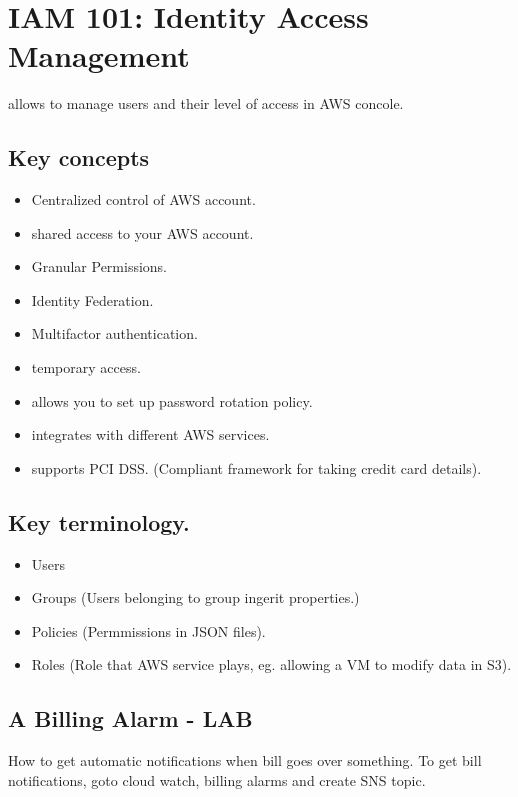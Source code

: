 \chapter{IAM 101: Identity Access Management}
allows to manage users and their level of access in AWS concole.

\section{Key concepts}
\begin{itemize}
	\item Centralized control of AWS account.
	\item shared access to your AWS account.
	\item Granular Permissions.
	\item Identity Federation.
	\item Multifactor authentication.
	\item temporary access.
	\item allows you to set up password rotation policy.
	\item integrates with different AWS services.
	\item supports PCI DSS. (Compliant framework for taking credit card details).
\end{itemize}

\section{Key terminology.}
\begin{itemize}
\item Users
\item Groups (Users belonging to group ingerit properties.)
\item Policies (Permmissions in JSON files).
\item Roles (Role that AWS service plays, eg. allowing a VM to modify data in S3).
\end{itemize}

\section{A Billing Alarm - LAB}
How to get automatic notifications when bill goes over something.
To get bill notifications, goto cloud watch, billing alarms and create SNS topic.

